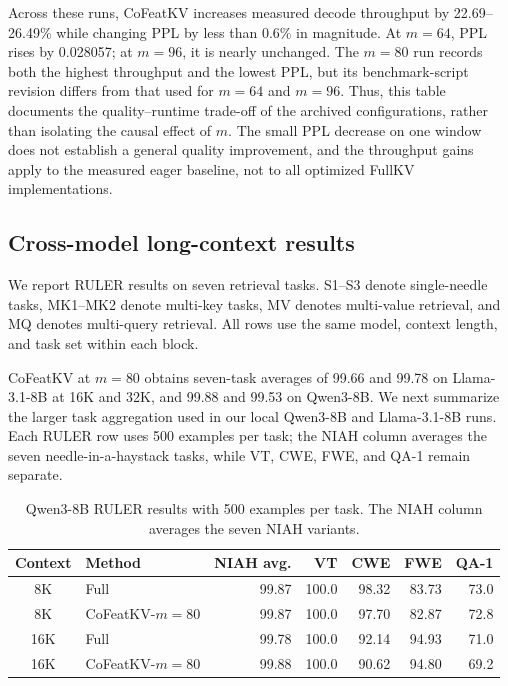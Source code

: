\documentclass{article} %
\begin{document}
Across these runs, CoFeatKV increases measured decode throughput by
22.69--26.49\% while changing PPL by less than 0.6\% in magnitude. At
$m=64$, PPL rises by 0.028057; at $m=96$, it is nearly unchanged. The
$m=80$ run records both the highest throughput and the lowest PPL, but
its benchmark-script revision differs from that used for $m=64$ and
$m=96$. Thus, this table documents the quality--runtime trade-off of the
archived configurations, rather than isolating the causal effect of $m$.
The small PPL decrease on one window does not establish a general quality
improvement, and the throughput gains apply to the measured eager baseline,
not to all optimized FullKV implementations.
\fi

\subsection{Cross-model long-context results}

We report RULER results on seven retrieval tasks. S1--S3
denote single-needle tasks, MK1--MK2 denote multi-key tasks, MV denotes
multi-value retrieval, and MQ denotes multi-query retrieval. All rows use
the same model, context length, and task set
within each block.



CoFeatKV at $m=80$ obtains seven-task averages of 99.66 and 99.78 on
Llama-3.1-8B at 16K and 32K, and 99.88 and 99.53 on Qwen3-8B.
We next summarize the larger
task aggregation used in our local Qwen3-8B and Llama-3.1-8B runs. Each RULER
row uses 500 examples per task; the NIAH column averages the seven
needle-in-a-haystack tasks, while VT, CWE, FWE, and QA-1 remain separate.

\begin{table}[H]
\centering
\caption{Qwen3-8B RULER results with 500 examples per task. The NIAH
column averages the seven NIAH variants.}
\label{tab:ruler8b}
\small
\setlength{\tabcolsep}{4pt}
\begin{tabular}{clrrrrr}
\toprule
Context & Method & NIAH avg. & VT & CWE & FWE & QA-1 \\
\midrule
8K  & Full & 99.87 & 100.0 & 98.32 & 83.73 & 73.0 \\
8K  & CoFeatKV-$m=80$ & 99.87 & 100.0 & 97.70 & 82.87 & 72.8 \\
16K & Full & 99.78 & 100.0 & 92.14 & 94.93 & 71.0 \\
16K & CoFeatKV-$m=80$ & 99.88 & 100.0 & 90.62 & 94.80 & 69.2 \\
\bottomrule
\end{tabular}
\end{table}
\end{document}
